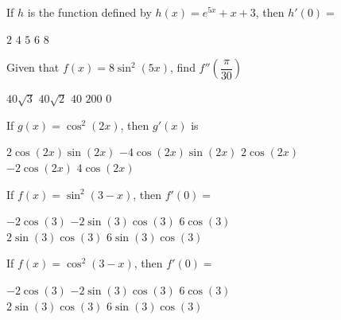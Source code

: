 \begin{questions}
    \question If $h$ is the function defined by $h(x) = e^{5x} + x + 3$, then $h'(0) = $ \\
    
    \begin{oneparchoices}
        \choice $2$
        \choice $4$
        \choice $5$
        \choice $6$
        \choice $8$
    \end{oneparchoices} \par \horizontalline

    \question Given that $f(x) = 8\sin^2 (5x)$, find $f''\left(\dfrac{\pi}{30}\right)$ \\

    \begin{oneparchoices}
        \choice $40\sqrt{3}$
        \choice $40\sqrt{2}$
        \choice $40$
        \choice $200$
        \choice $0$
    \end{oneparchoices} \par \horizontalline

    \question If $g(x) = \cos^2 (2x)$, then $g'(x)$ is \\

    \begin{oneparchoices}
        \choice $2\cos (2x)\sin (2x)$
        \choice $-4\cos (2x)\sin (2x)$
        \choice $2\cos (2x)$ \\[11pt]
        \makebox[0.25 \textwidth] \choice $-2\cos (2x)$ 
        \makebox[0.25 \textwidth] \choice $4\cos (2x)$
    \end{oneparchoices} \par \horizontalline

    \question If $f(x) = \sin^2(3 - x)$, then $f'(0) = $ \\

    \begin{oneparchoices}
        \choice $-2\cos (3)$
        \choice $-2\sin (3)\cos (3)$
        \choice $6\cos (3)$ \\[11pt]
        \makebox[0.25 \textwidth] \choice $2\sin (3)\cos (3)$ 
        \makebox[0.23 \textwidth] \choice $6\sin (3)\cos (3)$  
    \end{oneparchoices} \par \horizontalline 

    \question If $f(x) = \cos^2(3 - x)$, then $f'(0) = $ \\

    \begin{oneparchoices}
        \choice $-2\cos (3)$
        \choice $-2\sin (3)\cos (3)$
        \choice $6\cos (3)$ \\[11pt]
        \makebox[0.25 \textwidth] \choice $2\sin (3)\cos (3)$ 
        \makebox[0.23 \textwidth] \choice $6\sin (3)\cos (3)$  
    \end{oneparchoices} \par \horizontalline 


\end{questions}
